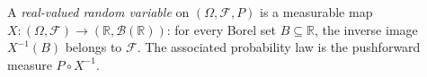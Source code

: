 
A \emph{real-valued random variable} on $(\Omega,\mathcal F,P)$ is a measurable map $X:(\Omega,\mathcal F)\to(\mathbb R,\mathcal B(\mathbb R))$: for every Borel set $B\subseteq\mathbb R$, the inverse image $X^{-1}(B)$ belongs to $\mathcal F$. The associated probability law is the pushforward measure $P\circ X^{-1}$.
